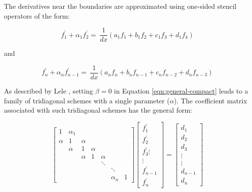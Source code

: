 \documentclass{elsarticle}
\begin{document}
The derivatives near the boundaries are approximated using
one-sided stencil operators of the form:

\begin{equation}
f^{\prime}_1 + \alpha_1 f^{\prime}_2 = \
    \frac{1}{dx} (a_1 f_1 + b_1 f_2 + c_1 f_3 + d_1 f_4) 
\end{equation}

and 

\begin{equation}
    f^{\prime}_n + \alpha_n f^{\prime}_{n-1} = \
    \frac{1}{dx} (a_n f_n + b_n f_{n-1} + c_n f_{n-2} + d_n f_{n-3}) 
\end{equation}

As described by Lele \cite{lele1992compact},
setting $\beta = 0$ in Equation \ref{eqn:general-compact} leads to
a family of tridiagonal schemes with a single parameter ($\alpha$).
The coefficient matrix associated with such tridiagonal schemes
has the general form:

\begin{equation} \label{eqn:compact-tridiagonal-system}
\begin{bmatrix}
     1 &  \alpha_1  \\
     \alpha   &  1   &  \alpha \\
         &  \alpha   &  1  &  \alpha  \\
         &      &  \alpha  &  1  &  \alpha  \\
         &      &     &     &  \ddots \\
         &      &     &     &     &  \ddots  \\
         &      &     &     &     &  \alpha_n &  1
\end{bmatrix}
\begin{bmatrix}
    f^{\prime}_1 \\
    f^{\prime}_2 \\
    f^{\prime}_3 
    \vdots \\
    \vdots \\
    f^{\prime}_{n-1} \\
    f^{\prime}_n
 \end{bmatrix}
=
\begin{bmatrix}
   d_1 \\
   d_2 \\
   d_3 \\
   \vdots \\
   \vdots \\
   d_{n-1} \\
   d_{n}
\end{bmatrix}
\end{equation}
\end{document}
